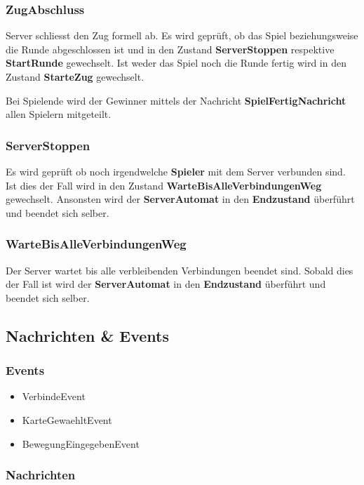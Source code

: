 \documentclass[12pt,halfparskip]{scrartcl}
\begin{document}
\subsubsection{ZugAbschluss}
\label{ssub:zugabschluss}
Server schliesst den Zug formell ab. Es wird geprüft, ob das Spiel beziehungsweise die Runde abgeschlossen ist und in den Zustand \textbf{ServerStoppen} respektive \textbf{StartRunde} gewechselt. Ist weder das Spiel noch die Runde fertig wird in den Zustand \textbf{StarteZug} gewechselt.

Bei Spielende wird der Gewinner mittels der Nachricht \textbf{SpielFertigNachricht} allen Spielern mitgeteilt.
	
\subsubsection{ServerStoppen}
Es wird geprüft ob noch irgendwelche \textbf{Spieler} mit dem Server verbunden sind. Ist dies der Fall wird in den Zustand \textbf{WarteBisAlleVerbindungenWeg} gewechselt. Ansonsten wird der \textbf{ServerAutomat} in den \textbf{Endzustand} überführt und beendet sich selber.

\subsubsection{WarteBisAlleVerbindungenWeg}

Der Server wartet bis alle verbleibenden Verbindungen beendet sind. Sobald dies der Fall ist wird der \textbf{ServerAutomat} in den \textbf{Endzustand} überführt und beendet sich selber.

\clearpage
\subsection{Nachrichten \& Events}
\label{sub:nachrichten_und_events}


\subsubsection{Events}
\label{ssub:events}

\begin{itemize}
	\item VerbindeEvent
	\item KarteGewaehltEvent
	\item BewegungEingegebenEvent
\end{itemize}

\subsubsection{Nachrichten}
\label{ssub:nachrichten}
\end{document}
